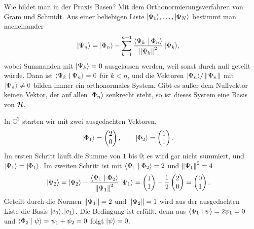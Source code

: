 Wie bildet man in der Praxis Basen? Mit dem Orthonormierungsverfahren von Gram und Schmidt. Aus einer beliebigen Liste $\lvert \Phi_1 \rangle,\dots,\lvert \Phi_N \rangle$ bestimmt man nacheinander
\begin{equation}
	\lvert \Psi_n \rangle = \lvert \Phi_n \rangle - \sum_{k=1}^{n-1}\frac{\langle \Psi_k \mid \Phi_n \rangle}{\left\lVert \Psi_k \right\rVert^2}\,\lvert \Psi_k \rangle,
\end{equation}
wobei Summanden mit $\lvert \Psi_k \rangle = 0$ ausgelassen werden, weil sonst durch null geteilt würde. Dann ist $\langle \Psi_k \mid \Psi_n \rangle = 0$ für $k<n$, und die Vektoren $\lvert \Psi_n \rangle/\left\lVert \Psi_n \right\rVert$ mit $\lvert \Psi_n \rangle \neq 0$ bilden immer ein orthonormales System. Gibt es außer dem Nullvektor keinen Vektor, der auf allen $\lvert \Phi_n \rangle$ senkrecht steht, so ist dieses System eine Basis von $\mathcal{H}$.

\begin{beispiel}
	In $\mathbb{C}^2$ starten wir mit zwei ausgedachten Vektoren,
	\begin{equation}
		\lvert \Phi_1 \rangle = \begin{pmatrix} 2 \\ 0 \end{pmatrix}, \qquad
		\lvert \Phi_2 \rangle = \begin{pmatrix} 1 \\ 1 \end{pmatrix}.
	\end{equation}
	Im ersten Schritt läuft die Summe von $1$ bis $0$; es wird gar nicht summiert, und $\lvert \Psi_1 \rangle = \lvert \Phi_1 \rangle$. Im zweiten Schritt ist mit $\langle \Psi_1 \mid \Phi_2 \rangle = 2$ und $\left\lVert \Psi_1 \right\rVert^2 = 4$
	\begin{equation}
		\lvert \Psi_2 \rangle = \lvert \Phi_2 \rangle - \frac{\langle \Psi_1 \mid \Phi_2 \rangle}{\left\lVert \Psi_1 \right\rVert^2}\,\lvert \Psi_1 \rangle
		= \begin{pmatrix} 1 \\ 1 \end{pmatrix} - \frac{1}{2}\begin{pmatrix} 2 \\ 0 \end{pmatrix}
		= \begin{pmatrix} 0 \\ 1 \end{pmatrix}.
	\end{equation}
	Geteilt durch die Normen $\left\lVert \Psi_1 \right\rVert = 2$ und $\left\lVert \Psi_2 \right\rVert = 1$ wird aus der ausgedachten Liste die Basis $\lvert e_0 \rangle,\lvert e_1 \rangle$. Die Bedingung ist erfüllt, denn aus $\langle \Phi_1 \mid \psi \rangle = 2\psi_1 = 0$ und $\langle \Phi_2 \mid \psi \rangle = \psi_1 + \psi_2 = 0$ folgt $\lvert \psi \rangle = 0$.
\end{beispiel}

